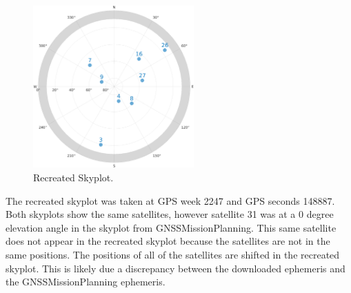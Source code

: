 \documentclass[11pt]{article}
\begin{document}
\begin{enumerate}[label=\textbf{\arabic*.}]
  \begin{figure}[H]
    \centering
    \includegraphics[width=0.55\textwidth]{lab1_skyplot.png}
    \caption{Recreated Skyplot.}
  \end{figure}
  The recreated skyplot was taken at GPS week 2247 and GPS seconds 148887. 
  Both skyplots show the same satellites, however satellite 31 was at a 0 
  degree elevation angle in the skyplot from GNSSMissionPlanning. This same 
  satellite does not appear in the recreated skyplot because the satellites 
  are not in the same positions. The positions of all of the satellites are 
  shifted in the recreated skyplot. This is likely due a discrepancy between 
  the downloaded ephemeris and the GNSSMissionPlanning ephemeris.
\end{enumerate}
\end{document}
